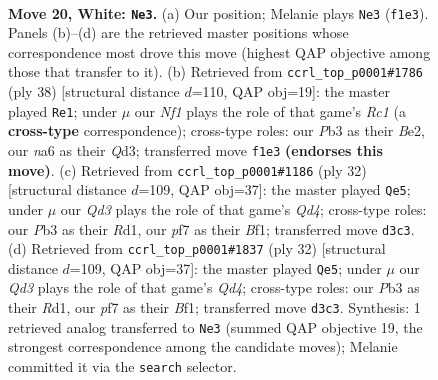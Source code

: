\documentclass[11pt]{article}
\begin{document}
\clearpage

\begin{figure}[p]\centering
\begin{subfigure}{0.46\textwidth}\centering
\resizebox{\linewidth}{!}{%
\newchessgame
\chessboard[
  setfen={r1bq1k2/pp3pp1/n3p3/3pP3/3n1r2/PP1Q4/6PP/R3KNNR w KQ - 0 20},
  showmover=false,
  pgfstyle=straightmove, color=movearrow, markmove={f1-e3}
]}
\caption{}
\end{subfigure}\hfill
\begin{subfigure}{0.46\textwidth}\centering
\resizebox{\linewidth}{!}{%
\newchessgame
\chessboard[
  setfen={r5k1/p4pp1/1p1qbn1p/2rp4/3N4/3QPP2/PP2B1PP/R1R3K1 w - - 1 20},
  showmover=false,
  pgfstyle=straightmove, color=movearrow, markmove={c1-e1}
]}
\caption{}
\end{subfigure}
\\[4pt]
\begin{subfigure}{0.46\textwidth}\centering
\resizebox{\linewidth}{!}{%
\newchessgame
\chessboard[
  setfen={r4rk1/p3pp1p/2p1b1p1/q2n4/N2Q2P1/1P3P2/P1P4P/2KR1B1R w - - 1 17},
  showmover=false,
  pgfstyle=straightmove, color=movearrow, markmove={d4-e5}
]}
\caption{}
\end{subfigure}\hfill
\begin{subfigure}{0.46\textwidth}\centering
\resizebox{\linewidth}{!}{%
\newchessgame
\chessboard[
  setfen={r4rk1/p3pp1p/2p1b1p1/q2n4/N2Q2P1/1P3P2/P1P4P/2KR1B1R w - - 1 17},
  showmover=false,
  pgfstyle=straightmove, color=movearrow, markmove={d4-e5}
]}
\caption{}
\end{subfigure}
\caption{\textbf{Move 20, White: \texttt{Ne3}.} (a) Our position; Melanie plays \texttt{Ne3} (\texttt{f1e3}). Panels (b)--(d) are the retrieved master positions whose correspondence most drove this move (highest QAP objective among those that transfer to it). (b) Retrieved from \texttt{ccrl\_top\_p0001\#1786} (ply 38) [structural distance $d$=110, QAP obj=19]: the master played \texttt{Re1}; under $\mu$ our \emph{Nf1} plays the role of that game's \emph{Rc1} (a \textbf{cross-type} correspondence); cross-type roles: our \emph{P}b3 as their \emph{B}e2, our \emph{n}a6 as their \emph{Q}d3; transferred move \texttt{f1e3} \textbf{(endorses this move)}. (c) Retrieved from \texttt{ccrl\_top\_p0001\#1186} (ply 32) [structural distance $d$=109, QAP obj=37]: the master played \texttt{Qe5}; under $\mu$ our \emph{Qd3} plays the role of that game's \emph{Qd4}; cross-type roles: our \emph{P}b3 as their \emph{R}d1, our \emph{p}f7 as their \emph{B}f1; transferred move \texttt{d3c3}. (d) Retrieved from \texttt{ccrl\_top\_p0001\#1837} (ply 32) [structural distance $d$=109, QAP obj=37]: the master played \texttt{Qe5}; under $\mu$ our \emph{Qd3} plays the role of that game's \emph{Qd4}; cross-type roles: our \emph{P}b3 as their \emph{R}d1, our \emph{p}f7 as their \emph{B}f1; transferred move \texttt{d3c3}. Synthesis: 1 retrieved analog transferred to \texttt{Ne3} (summed QAP objective 19, the strongest correspondence among the candidate moves); Melanie committed it via the \texttt{search} selector.}
\label{fig:thought-m38}
\end{figure}
\end{document}
